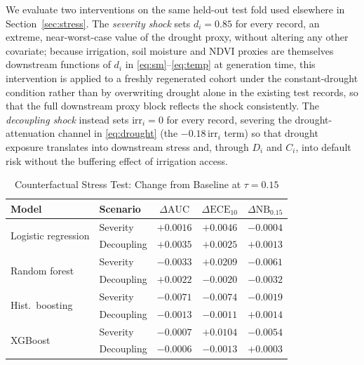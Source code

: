\documentclass[journal]{IEEEtran}
\newcommand{\auc}{\mbox{AUC}}
\begin{document}
We evaluate two interventions on the same held-out test fold used elsewhere in Section~\ref{sec:stress}. The \emph{severity shock} sets $d_i=0.85$ for every record, an extreme, near-worst-case value of the drought proxy, without altering any other covariate; because irrigation, soil moisture and NDVI proxies are themselves downstream functions of $d_i$ in \eqref{eq:sm}--\eqref{eq:temp} at generation time, this intervention is applied to a freshly regenerated cohort under the constant-drought condition rather than by overwriting drought alone in the existing test records, so that the full downstream proxy block reflects the shock consistently. The \emph{decoupling shock} instead sets $\text{irr}_i=0$ for every record, severing the drought-attenuation channel in \eqref{eq:drought} (the $-0.18\,\text{irr}_i$ term) so that drought exposure translates into downstream stress and, through $D_i$ and $C_i$, into default risk without the buffering effect of irrigation access.

\begin{table}[!t]
\caption{Counterfactual Stress Test: Change from Baseline at $\tau=0.15$}
\label{tab:causal}
\centering
\footnotesize
\setlength{\tabcolsep}{3.2pt}
\begin{tabular}{@{}llccc@{}}
\toprule
Model & Scenario & $\Delta\auc$ & $\Delta\text{ECE}_{10}$ & $\Delta\text{NB}_{0.15}$ \\
\midrule
\multirow{2}{*}{Logistic regression} & Severity  & $+0.0016$ & $+0.0046$ & $-0.0004$ \\
                                      & Decoupling& $+0.0035$ & $+0.0025$ & $+0.0013$ \\
\multirow{2}{*}{Random forest}       & Severity  & $-0.0033$ & $+0.0209$ & $-0.0061$ \\
                                      & Decoupling& $+0.0022$ & $-0.0020$ & $-0.0032$ \\
\multirow{2}{*}{Hist.\ boosting}     & Severity  & $-0.0071$ & $-0.0074$ & $-0.0019$ \\
                                      & Decoupling& $-0.0013$ & $-0.0011$ & $+0.0014$ \\
\multirow{2}{*}{XGBoost}             & Severity  & $-0.0007$ & $+0.0104$ & $-0.0054$ \\
                                      & Decoupling& $-0.0006$ & $-0.0013$ & $+0.0003$ \\
\bottomrule
\end{tabular}
\end{table}
\end{document}
